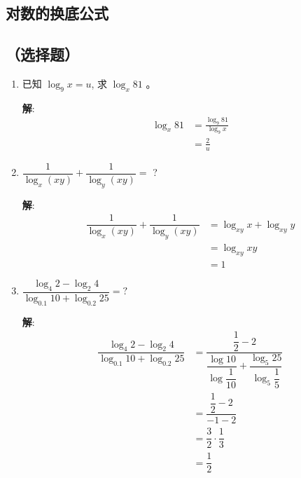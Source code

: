 \documentclass{report}
\newcommand{\sol}{\vspace{0.2cm}\textbf{解}:}
\begin{document}
\begin{multicols*}{2}
    \section{对数的换底公式}

    \subsection*{（选择题）}

    \begin{enumerate}[leftmargin=*]
        \item 已知 $\log _9 x=u$, 求 $\log _x 81$ 。

              \sol{}
              \begin{align*}
                  \log_x 81 & = \frac{\log_9 81}{\log_9 x} \\
                            & = \frac{2}{u}
              \end{align*}

        \item $\dfrac{1}{\log _x(x y)}+\dfrac{1}{\log _y(x y)}=$ ?

              \sol{}
              \begin{align*}
                  \dfrac{1}{\log _x(x y)}+\dfrac{1}{\log _y(x y)} & = \log_{xy} x + \log_{xy} y \\
                                                                  & = \log_{xy} xy              \\
                                                                  & = 1
              \end{align*}

        \item $\dfrac{\log _4 2-\log _2 4}{\log _{0.1} 10+\log _{0.2} 25}=?$

              \sol{}
              \begin{align*}
                  \dfrac{\log _4 2-\log _2 4}{\log _{0.1} 10+\log _{0.2} 25} & = \dfrac{\dfrac{1}{2} - 2}{\dfrac{\log 10}{\log \dfrac{1}{10}} + \dfrac{\log_5 25}{\log_5 \dfrac{1}{5}}} \\
                                                                             & = \dfrac{\dfrac{1}{2} - 2}{-1 - 2}                                                                       \\
                                                                             & = \dfrac{3}{2} \cdot \dfrac{1}{3}                                                                        \\
                                                                             & = \dfrac{1}{2}
              \end{align*}


\end{enumerate}
\end{multicols*}
\end{document}
